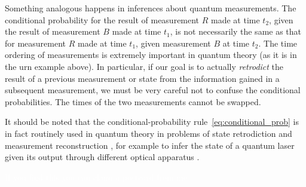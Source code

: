 \documentclass[\ifafour a4paper,12pt,\else a5paper,10pt,\fi%
onecolumn,oneside,article,%
british%
]{memoir}
\makeatletter
\theoremstyle{remark}
\theoremstyle{innote}
\def\sum{\DOTSI\sumop\slimits@}
\newcommand*{\de}{\partialup}%
\newcommand*{\p}{\mathrm{P}}%
\renewcommand*{\|}[1][]{\nonscript\,#1\vert\nonscript\;\mathopen{}}
\newcommand*{\sect}{\S}%
\newcommand*{\chaps}{chs}%
\newcommand*{\tsum}{\mathop{\textstyle\sum}\nolimits}
\makeatother
\begin{document}
Something analogous \parencite[see][for an exact parallel
see]{portamana2003_r2004} happens in inferences about quantum measurements.
The conditional probability for the result of measurement $R$ made at time
$t_{2}$, given the result of measurement $B$ made at time $t_{1}$, is not
necessarily the same as that for measurement $R$ made at time $t_{1}$,
given measurement $B$ at time $t_{2}$. The time ordering of measurements is
extremely important in quantum theory (as it is in the urn example above).
In particular, if our goal is to actually \emph{retrodict} the result of
a previous measurement or state from the information gained in a subsequent
measurement, we must be very careful not to confuse the conditional
probabilities. The times of the two measurements cannot be swapped.

It should be noted that the conditional-probability
rule~\eqref{eq:conditional_prob} is in fact routinely used in quantum
theory in problems of state retrodiction and measurement reconstruction
\parencites{jones1991b,slater1995b}[\chaps~7,8]{demuynck2002b}{zimanetal2004_r2006,darianoetal2004}[see][\sect~1
for many further references]{maanssonetal2006},
for example to infer the state of a quantum laser given its output through
different optical apparatus \parencite{leonhardt1997}.

\textcolor{white}{If you find this you can claim a postcard from me.}



\end{document}
